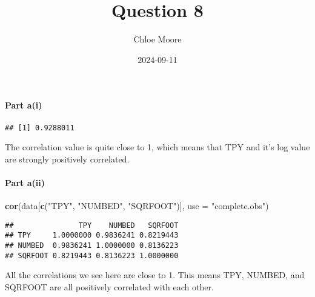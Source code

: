 \documentclass[
]{article}
\title{Question 8}
\author{Chloe Moore}
\date{2024-09-11}
\newenvironment{Shaded}{\begin{snugshade}}{\end{snugshade}}
\newcommand{\AttributeTok}[1]{\textcolor[rgb]{0.13,0.29,0.53}{#1}}
\newcommand{\FunctionTok}[1]{\textcolor[rgb]{0.13,0.29,0.53}{\textbf{#1}}}
\newcommand{\NormalTok}[1]{#1}
\newcommand{\OtherTok}[1]{\textcolor[rgb]{0.56,0.35,0.01}{#1}}
\newcommand{\SpecialCharTok}[1]{\textcolor[rgb]{0.81,0.36,0.00}{\textbf{#1}}}
\newcommand{\StringTok}[1]{\textcolor[rgb]{0.31,0.60,0.02}{#1}}
\begin{document}
\maketitle

\hypertarget{part-ai}{%
\paragraph{Part a(i)}\label{part-ai}}

\begin{Shaded}
\end{Shaded}

\begin{verbatim}
## [1] 0.9288011
\end{verbatim}

The correlation value is quite close to 1, which means that TPY and it's
log value are strongly positively correlated.

\hypertarget{part-aii}{%
\paragraph{Part a(ii)}\label{part-aii}}

\begin{Shaded}
\begin{Highlighting}[]
\FunctionTok{cor}\NormalTok{(data[}\FunctionTok{c}\NormalTok{(}\StringTok{"TPY"}\NormalTok{, }\StringTok{"NUMBED"}\NormalTok{, }\StringTok{"SQRFOOT"}\NormalTok{)], }\AttributeTok{use =} \StringTok{"complete.obs"}\NormalTok{)}
\end{Highlighting}
\end{Shaded}

\begin{verbatim}
##               TPY    NUMBED   SQRFOOT
## TPY     1.0000000 0.9836241 0.8219443
## NUMBED  0.9836241 1.0000000 0.8136223
## SQRFOOT 0.8219443 0.8136223 1.0000000
\end{verbatim}

All the correlations we see here are close to 1. This means TPY, NUMBED,
and SQRFOOT are all positively correlated with each other.
\end{document}
